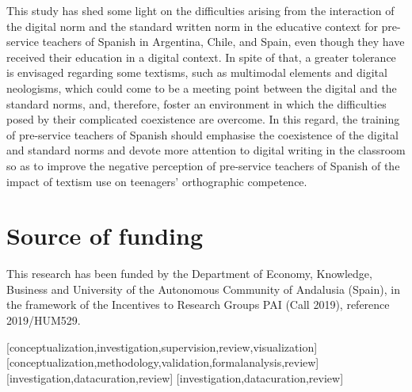 \documentclass[english]{textolivre}
\begin{document}
This study has shed some light on the difficulties arising from the interaction of the digital norm and the standard written norm in the educative context for pre-service teachers of Spanish in Argentina, Chile, and Spain, even though they have received their education in a digital context. In spite of that, a greater tolerance is envisaged regarding some textisms, such as multimodal elements and digital neologisms, which could come to be a meeting point between the digital and the standard norms, and, therefore, foster an environment in which the difficulties posed by their complicated coexistence are overcome. In this regard, the training of pre-service teachers of Spanish should emphasise the coexistence of the digital and standard norms and devote more attention to digital writing in the classroom so as to improve the negative perception of pre-service teachers of Spanish of the impact of textism use on teenagers’ orthographic competence.


\section{Source of funding}
This research has been funded by the Department of Economy, Knowledge, Business and University of the Autonomous Community of Andalusia (Spain), in the framework of the Incentives to Research Groups PAI (Call 2019), reference 2019/HUM529.

\printbibliography\label{sec-bib}

\begin{contributors}
[conceptualization,investigation,supervision,review,visualization]
[conceptualization,methodology,validation,formalanalysis,review]
[investigation,datacuration,review]
[investigation,datacuration,review]
\end{contributors}

\end{document}
